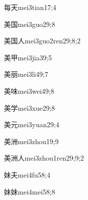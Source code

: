 \begin{verbete}{每天}{mei3tian1}{7;4}
\end{verbete}

\begin{verbete}{美国}{mei3guo2}{9;8}
\end{verbete}

\begin{verbete}{美国人}{mei3guo2ren2}{9;8;2}
\end{verbete}

\begin{verbete}{美甲}{mei3jia3}{9;5}
\end{verbete}

\begin{verbete}{美丽}{mei3li4}{9;7}
\end{verbete}

\begin{verbete}{美味}{mei3wei4}{9;8}
\end{verbete}

\begin{verbete}{美学}{mei3xue2}{9;8}
\end{verbete}

\begin{verbete}{美元}{mei3yuan2}{9;4}
\end{verbete}

\begin{verbete}{美洲}{mei3zhou1}{9;9}
\end{verbete}

\begin{verbete}{美洲人}{mei3zhou1ren2}{9;9;2}
\end{verbete}

\begin{verbete}{妹夫}{mei4fu5}{8;4}
\end{verbete}

\begin{verbete}{妹妹}{mei4mei5}{8;8}
\end{verbete}

